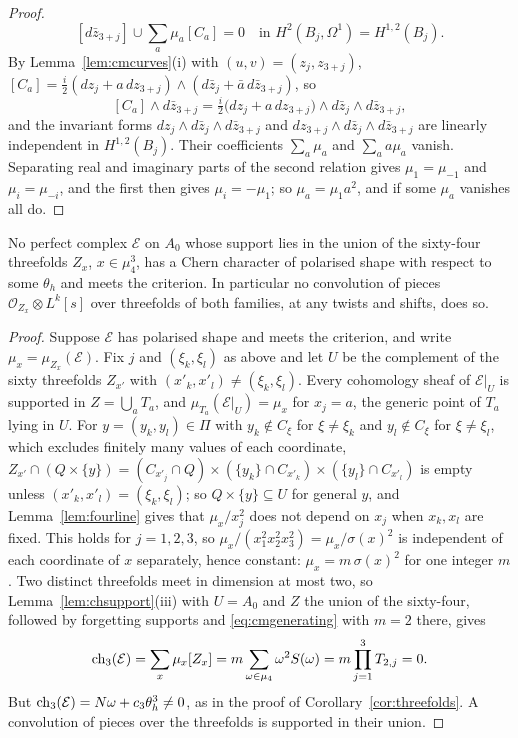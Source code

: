 \begin{proof}
\[
[d\bar z_{3+j}]\cup\sum_{a}\mu_{a}[C_{a}]=0\quad\text{in }H^{2}(B_{j},\Omega^{1})=H^{1,2}(B_{j}).
\]
By Lemma~\ref{lem:cmcurves}(i) with $(u,v)=(z_{j},z_{3+j})$, $[C_{a}]=\tfrac{i}{2}(dz_{j}+a\,dz_{3+j})\wedge(d\bar z_{j}+\bar a\,d\bar z_{3+j})$, so
\[
[C_{a}]\wedge d\bar z_{3+j}=\tfrac{i}{2}\bigl(dz_{j}+a\,dz_{3+j}\bigr)\wedge d\bar z_{j}\wedge d\bar z_{3+j},
\]
and the invariant forms $dz_{j}\wedge d\bar z_{j}\wedge d\bar z_{3+j}$ and $dz_{3+j}\wedge d\bar z_{j}\wedge d\bar z_{3+j}$ are linearly independent in $H^{1,2}(B_{j})$. Their coefficients $\sum_{a}\mu_{a}$ and $\sum_{a}a\mu_{a}$ vanish. Separating real and imaginary parts of the second relation gives $\mu_{1}=\mu_{-1}$ and $\mu_{i}=\mu_{-i}$, and the first then gives $\mu_{i}=-\mu_{1}$; so $\mu_{a}=\mu_{1}a^{2}$, and if some $\mu_{a}$ vanishes all do.
\end{proof}

\begin{theorem}\label{thm:sixtyfour}
No perfect complex $\mathcal{E}$ on $A_{0}$ whose support lies in the union of the sixty-four threefolds $Z_{x}$, $x\in\mu_{4}^{3}$, has a Chern character of polarised shape with respect to some $\theta_{h}$ and meets the criterion. In particular no convolution of pieces $\mathcal{O}_{Z_{x}}\otimes L^{k}[s]$ over threefolds of both families, at any twists and shifts, does so.
\end{theorem}

\begin{proof}
Suppose $\mathcal{E}$ has polarised shape and meets the criterion, and write $\mu_{x}=\mu_{Z_{x}}(\mathcal{E})$. Fix $j$ and $(\xi_{k},\xi_{l})$ as above and let $U$ be the complement of the sixty threefolds $Z_{x'}$ with $(x'_{k},x'_{l})\ne(\xi_{k},\xi_{l})$. Every cohomology sheaf of $\mathcal{E}|_{U}$ is supported in $Z=\bigcup_{a}T_{a}$, and $\mu_{T_{a}}(\mathcal{E}|_{U})=\mu_{x}$ for $x_{j}=a$, the generic point of $T_{a}$ lying in $U$. For $y=(y_{k},y_{l})\in\Pi$ with $y_{k}\notin C_{\xi}$ for $\xi\ne\xi_{k}$ and $y_{l}\notin C_{\xi}$ for $\xi\ne\xi_{l}$, which excludes finitely many values of each coordinate, $Z_{x'}\cap(Q\times\{y\})=(C_{x'_{j}}\cap Q)\times(\{y_{k}\}\cap C_{x'_{k}})\times(\{y_{l}\}\cap C_{x'_{l}})$ is empty unless $(x'_{k},x'_{l})=(\xi_{k},\xi_{l})$; so $Q\times\{y\}\subseteq U$ for general $y$, and Lemma~\ref{lem:fourline} gives that $\mu_{x}/x_{j}^{2}$ does not depend on $x_{j}$ when $x_{k},x_{l}$ are fixed. This holds for $j=1,2,3$, so $\mu_{x}/(x_{1}^{2}x_{2}^{2}x_{3}^{2})=\mu_{x}/\sigma(x)^{2}$ is independent of each coordinate of $x$ separately, hence constant: $\mu_{x}=m\,\sigma(x)^{2}$ for one integer $m$. Two distinct threefolds meet in dimension at most two, so Lemma~\ref{lem:chsupport}(iii) with $U=A_{0}$ and $Z$ the union of the sixty-four, followed by forgetting supports and \eqref{eq:cmgenerating} with $m=2$ there, gives
\[
\mathrm{ch}_{3}(\mathcal{E})=\sum_{x}\mu_{x}[Z_{x}]=m\sum_{\omega\in\mu_{4}}\omega^{2}S(\omega)=m\prod_{j=1}^{3}T_{2,j}=0 .
\]
But $\mathrm{ch}_{3}(\mathcal{E})=N\omega+c_{3}\theta_{h}^{3}\ne0$, as in the proof of Corollary~\ref{cor:threefolds}. A convolution of pieces over the threefolds is supported in their union.
\end{proof}

